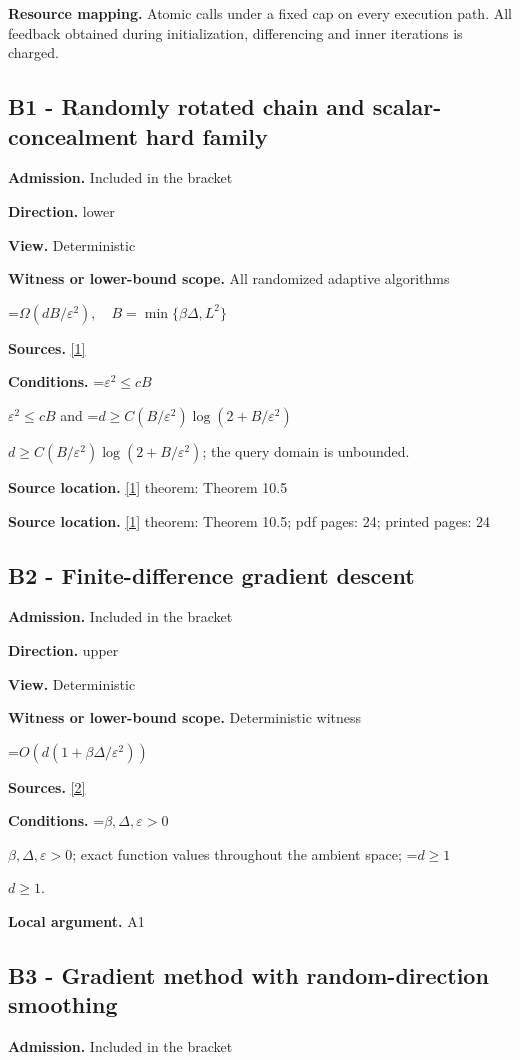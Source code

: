 \documentclass[10pt,a4paper]{article}
\newcommand{\AtlasMath}[1]{\par\begingroup\centering\setbox0=\hbox{$\displaystyle #1$}\ifdim\wd0>1.4\linewidth\typeout{ATLAS WIDE FORMULA: \the\wd0}\fi\ifdim\wd0>\linewidth\resizebox{\linewidth}{!}{\box0}\else\box0\fi\par\endgroup}
\newcommand{\AtlasInlineMath}[1]{\begingroup\setbox0=\hbox{$#1$}\ifdim\wd0>.4\linewidth\endgroup\AtlasMath{#1}\else\endgroup$#1$\fi}
\begin{document}
\textbf{Resource mapping.} Atomic calls under a fixed cap on every execution path. All feedback obtained during initialization, differencing and inner iterations is charged.

\subsection{B1 - Randomly rotated chain and scalar-concealment hard family}
\textbf{Admission.} Included in the bracket

\textbf{Direction.} lower

\textbf{View.} Deterministic

\textbf{Witness or lower-bound scope.} All randomized adaptive algorithms

\AtlasMath{\Omega(dB/\varepsilon^2),\quad B=\min\{\beta \Delta,L^2\}}
\textbf{Sources.} \href{https://arxiv.org/html/2610.19652v1}{[1]}

\textbf{Conditions.} \AtlasInlineMath{\varepsilon^2\le cB} and \AtlasInlineMath{d\ge C(B/\varepsilon^2)\log(2+B/\varepsilon^2)}; the query domain is unbounded.

\textbf{Source location.} \href{https://arxiv.org/html/2610.19652v1}{[1]} theorem: Theorem 10.5

\textbf{Source location.} \href{https://arxiv.org/html/2610.19652v1}{[1]} theorem: Theorem 10.5; pdf pages: 24; printed pages: 24

\subsection{B2 - Finite-difference gradient descent}
\textbf{Admission.} Included in the bracket

\textbf{Direction.} upper

\textbf{View.} Deterministic

\textbf{Witness or lower-bound scope.} Deterministic witness

\AtlasMath{O(d(1+\beta\Delta/\varepsilon^2))}
\textbf{Sources.} \href{https://arxiv.org/pdf/1309.5549}{[2]}

\textbf{Conditions.} \AtlasInlineMath{\beta ,\Delta ,\varepsilon >0}; exact function values throughout the ambient space; \AtlasInlineMath{d\ge 1}.

\textbf{Local argument.} A1

\subsection{B3 - Gradient method with random-direction smoothing}
\textbf{Admission.} Included in the bracket
\end{document}

